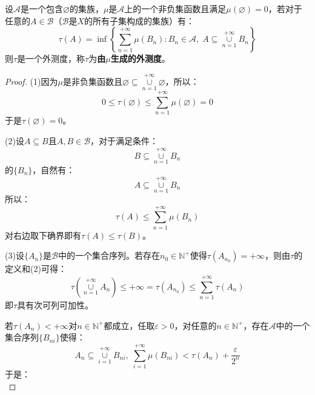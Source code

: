 \begin{theorem}
	设$\mathscr{A}$是一个包含$\varnothing$的集族，$\mu$是$\mathscr{A}$上的一个非负集函数且满足$\mu(\varnothing)=0$，若对于任意的$A\in\mathscr{B}$（$\mathscr{B}$是$X$的所有子集构成的集族）有：
	\begin{equation*}
		\tau(A)=\inf\left\{\sum_{n=1}^{+\infty}\mu(B_n):B_n\in\mathscr{A},\;A\subseteq\underset{n=1}{\overset{+\infty}{\cup}}B_n\right\}
	\end{equation*}
	则$\tau$是一个外测度，称$\tau$为\textbf{由$\mu$生成的外测度}。
\end{theorem}
\begin{proof}
	(1)因为$\mu$是非负集函数且$\varnothing\subseteq\underset{n=1}{\overset{+\infty}{\cup}}\varnothing$，所以：
	\begin{equation*}
		0\leqslant\tau(\varnothing)\leqslant\sum_{n=1}^{+\infty}\mu(\varnothing)=0
	\end{equation*}
	于是$\tau(\varnothing)=0$。\par
	(2)设$A\subseteq B$且$A,B\in\mathscr{B}$，对于满足条件：
	\begin{equation*}
		B\subseteq\underset{n=1}{\overset{+\infty}{\cup}}B_n
	\end{equation*}
	的$\{B_n\}$，自然有：
	\begin{equation*}
		A\subseteq\underset{n=1}{\overset{+\infty}{\cup}}B_n
	\end{equation*}
	所以：
	\begin{equation*}
		\tau(A)\leqslant\sum_{n=1}^{+\infty}\mu(B_n)
	\end{equation*}
	对右边取下确界即有$\tau(A)\leqslant\tau(B)$。\par
	(3)设$\{A_n\}$是$\mathscr{B}$中的一个集合序列。若存在$n_0\in\mathbb{N}^+$使得$\tau(A_{n_0})=+\infty$，则由$\tau$的定义和(2)可得：
	\begin{equation*}
		\tau\left(\underset{n=1}{\overset{+\infty}{\cup}}A_n\right)\leqslant+\infty=\tau(A_{n_0})\leqslant\sum_{n=1}^{+\infty}\tau(A_n)
	\end{equation*}
	即$\tau$具有次可列可加性。\par
	若$\tau(A_n)<+\infty$对$n\in\mathbb{N}^+$都成立，任取$\varepsilon>0$，对任意的$n\in\mathbb{N}^+$，存在$\mathscr{A}$中的一个集合序列$\{B_{ni}\}$使得：
	\begin{equation*}
		A_n\subseteq\underset{i=1}{\overset{+\infty}{\cup}}B_{ni},\;
		\sum_{i=1}^{+\infty}\mu(B_{ni})<\tau(A_n)+\frac{\varepsilon}{2^n}
	\end{equation*}
	于是：
	\begin{equation*}

\end{equation*}
\end{proof}
